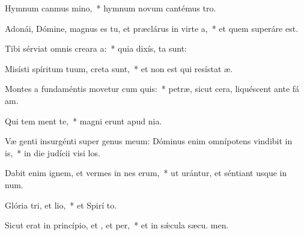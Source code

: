 \item Hymnum canmus mino,~* hymnum novum cantémus  tro.
\item Adonái, Dómine, magnus es tu, et præclárus in virte a,~* et quem superáre  est.
\item Tibi sérviat omnis creara a:~* quia dixís,  ta sunt:
\item Misísti spíritum tuum,  creta sunt,~* et non est qui resístat  æ.
\item Montes a fundaméntis movetur cum quis:~* petræ, sicut cera, liquéscent ante fá am.
\item Qui tem ment te,~* magni erunt apud   nia.
\item Væ genti insurgénti super genus meum: Dóminus enim omnípotens vindibit in is,~* in die judícii visi los.
\item Dabit enim ignem, et vermes in nes erum,~* ut urántur, et séntiant usque in num.
\item Glória tri, et lio,~* et Spirí to.
\item Sicut erat in princípio, et , et per,~* et in sǽcula sæcu. men.
